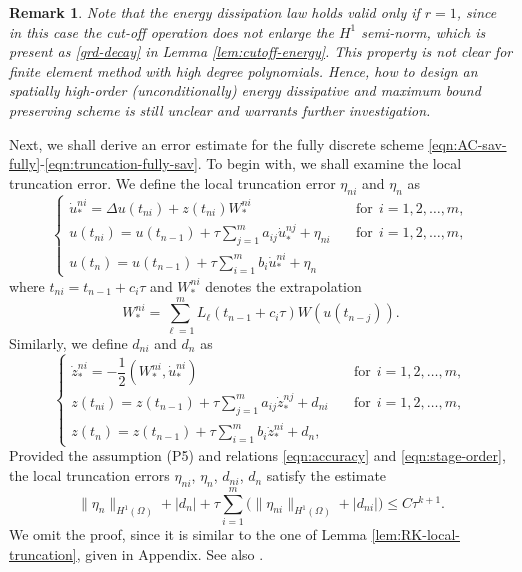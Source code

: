 \documentclass[10pt,final,leqno,onefignum,onetabnum]{siamltex}%
\newtheorem{remark}{Remark}[section]
\def\II{(\Omega)}
\begin{document}
\begin{remark}
Note that the energy dissipation law holds valid only if $r=1$,
since in this case the cut-off operation does not enlarge the $H^1$ semi-norm, which is present as \eqref{grd-decay} in Lemma \ref{lem:cutoff-energy}. This property is not clear for finite element method with high degree polynomials. Hence,
how to design an spatially high-order (unconditionally) energy dissipative and maximum bound preserving scheme
is still unclear and warrants further investigation.
\end{remark}


Next, we shall derive an error estimate for the fully discrete scheme \eqref{eqn:AC-sav-fully}-\eqref{eqn:truncation-fully-sav}.
To begin with, we shall examine the local truncation error. We define the local truncation error $\eta_{ni}$ and $\eta_{n}$  as
\begin{equation}\label{eqn:AC-sav-fully-trunc}
    \begin{cases}
    \dot u_*^{ni} = \Delta  u(t_{ni}) +  z(t_{ni}) W_*^{ni}&\quad \text{for} ~~i=1,2,\dots,m, \\ %
    u(t_{ni})=  u(t_{n-1}) + \tau \sum_{j=1}^m a_{ij} \dot u_*^{nj} + \eta_{ni}&\quad \text{for} ~~i=1,2,\dots,m, \\
    u(t_n) = u(t_{n-1}) + \tau \sum_{i=1}^m b_i \dot u_*^{ni} + \eta_{n}
  \end{cases}
\end{equation}
where $t_{ni}=t_{n-1}+c_i\tau$ and $W_*^{ni}$ denotes the extrapolation
$$ W_*^{ni} =  \sum_{\ell=1}^m L_{\ell}(t_{n-1}+c_i\tau) W(u(t_{n-j})). $$
Similarly, we define $d_{ni}$ and $d_{n}$ as
\begin{equation}\label{eqn:r-fully-trunc}
\begin{cases}
    \dot z_*^{ni} = - \dfrac12(W_*^{ni},   \dot u^{ni}_*) &\quad \text{for} ~~i=1,2,\dots,m, \\
    z(t_{ni}) = z(t_{n-1}) + \tau \sum_{j=1}^m a_{ij}  \dot z_*^{nj}+ d_{ni}&\quad \text{for} ~~i=1,2,\dots,m, \\
   z(t_{n}) = z(t_{n-1}) +  \tau \sum_{i=1}^m b_i  \dot z_*^{ni}+d_{n},
 \end{cases}
\end{equation}
Provided the assumption (P5) and relations \eqref{eqn:accuracy} and \eqref{eqn:stage-order},
the local truncation errors $\eta_{ni}$,   $\eta_{n}$,  $d_{ni}$, $d_n$ satisfy the estimate
\begin{equation}\label{eqn:trunc}
\| \eta_n \|_{H^1\II} + | d_n | + \tau \sum_{i=1}^m \Big(\| \eta_{ni} \|_{H^1\II} + |d_{ni}|\Big) \le C \tau^{k+1}.
\end{equation}
We omit the proof, since it is similar to the one of Lemma \ref{lem:RK-local-truncation}, given in Appendix.
See also \cite[Lemma 3.1]{akrivis2019energy}.
\end{document}

